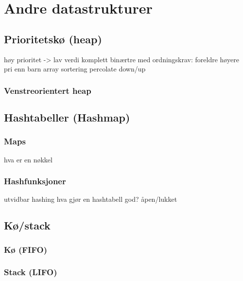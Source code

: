 \section{\color{red}Andre datastrukturer}
\subsection{\color{red}Prioritetskø (heap)}
høy prioritet -> lav verdi
komplett binærtre med ordningskrav: foreldre høyere pri enn barn
array
sortering
percolate down/up
\subsubsection{\color{red}Venstreorientert heap}
\subsection{\color{red}Hashtabeller (Hashmap)}
\subsubsection{\color{red}Maps}
hva er en nøkkel
\subsubsection{\color{red}Hashfunksjoner}
utvidbar hashing
hva gjør en hashtabell god?
åpen/lukket
\subsection{\color{red}Kø/stack}
\subsubsection{\color{red}Kø (FIFO)}
\subsubsection{\color{red}Stack (LIFO)}